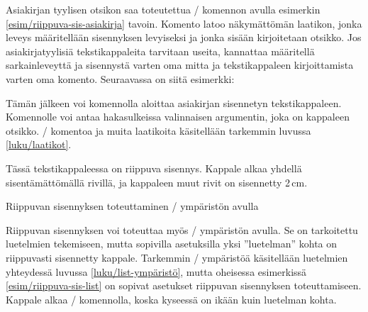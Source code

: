 \noindent
Asiakirjan tyylisen otsikon saa toteutettua \-/
komennon avulla esimerkin \ref{esim/riippuva-sis-asiakirja} tavoin.
Komento latoo näkymättömän laatikon, jonka leveys määritellään
sisennyksen levyiseksi ja jonka sisään kirjoitetaan otsikko. Jos
asiakirjatyylisiä tekstikappaleita tarvitaan useita, kannattaa
määritellä sarkainleveyttä ja sisennystä varten oma mitta ja
tekstikappaleen kirjoittamista varten oma komento. Seuraavassa on siitä
esimerkki:

\begin{koodilohkosis}
\newlength{\sarkain}
\setlength{\sarkain}{23mm}
\newcommand{\kappale}[1][]{\par\hangpara{2\sarkain}{1}%
  \makebox[2\sarkain][l]{\ignorespaces #1}\ignorespaces}
\end{koodilohkosis}

\noindent
Tämän jälkeen voi komennolla  aloittaa asiakirjan
sisennetyn tekstikappaleen. Komennolle voi antaa hakasulkeissa
valinnaisen argumentin, joka on kappaleen otsikko. \-/
komentoa ja muita laatikoita käsitellään tarkemmin luvussa
\ref{luku/laatikot}.

\begin{esimerkki*}
  \komentoi{,}

\begin{koodilohko}
\begin{list}{}{
    \setlength{\leftmargin}{2cm}
    \setlength{\itemindent}{-2cm}
  }
\item Tässä tekstikappaleessa on riippuva sisennys. Kappale alkaa
  yhdellä sisentämättömällä rivillä, ja kappaleen muut rivit on
  sisennetty 2\,cm.
\end{list}
\end{koodilohko}
  \caption{Riippuvan sisennyksen toteuttaminen \-/
    ympäristön avulla}
  \label{esim/riippuva-sis-list}
\end{esimerkki*}

Riippuvan sisennyksen voi toteuttaa myös \-/ ympäristön
avulla. Se on tarkoitettu luetelmien tekemiseen, mutta sopivilla
asetuksilla yksi ''luetelman'' kohta on riippuvasti sisennetty kappale.
Tarkemmin \-/ ympäristöä käsitellään luetelmien
yhteydessä luvussa \ref{luku/list-ympäristö}, mutta oheisessa
esimerkissä \ref{esim/riippuva-sis-list} on sopivat asetukset riippuvan
sisennyksen toteuttamiseen. Kappale alkaa \-/ komennolla,
koska kyseessä on ikään kuin luetelman kohta.

